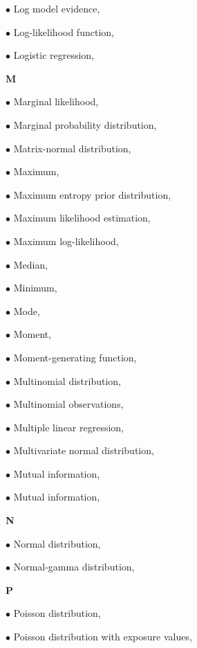 \documentclass[a4paper,12pt,twoside]{book}
\begin{document}
$\bullet$ Log model evidence, \pageref{sec:lme}

$\bullet$ Log-likelihood function, \pageref{sec:llf}

$\bullet$ Logistic regression, \pageref{sec:logreg}


\vspace{1em}
\textbf{M}

$\bullet$ Marginal likelihood, \pageref{sec:ml}

$\bullet$ Marginal probability distribution, \pageref{sec:dist-marg}

$\bullet$ Matrix-normal distribution, \pageref{sec:matn}

$\bullet$ Maximum, \pageref{sec:max}

$\bullet$ Maximum entropy prior distribution, \pageref{sec:prior-maxent}

$\bullet$ Maximum likelihood estimation, \pageref{sec:mle}

$\bullet$ Maximum log-likelihood, \pageref{sec:mll}

$\bullet$ Median, \pageref{sec:med}

$\bullet$ Minimum, \pageref{sec:min}

$\bullet$ Mode, \pageref{sec:mode}

$\bullet$ Moment, \pageref{sec:mom}

$\bullet$ Moment-generating function, \pageref{sec:mgf}

$\bullet$ Multinomial distribution, \pageref{sec:mult}

$\bullet$ Multinomial observations, \pageref{sec:mult-data}

$\bullet$ Multiple linear regression, \pageref{sec:mlr}

$\bullet$ Multivariate normal distribution, \pageref{sec:mvn}

$\bullet$ Mutual information, \pageref{sec:mi}

$\bullet$ Mutual information, \pageref{sec:mi}


\vspace{1em}
\textbf{N}

$\bullet$ Normal distribution, \pageref{sec:norm}

$\bullet$ Normal-gamma distribution, \pageref{sec:ng}


\vspace{1em}
\textbf{P}

$\bullet$ Poisson distribution, \pageref{sec:poiss}

$\bullet$ Poisson distribution with exposure values, \pageref{sec:poissexp}
\end{document}
